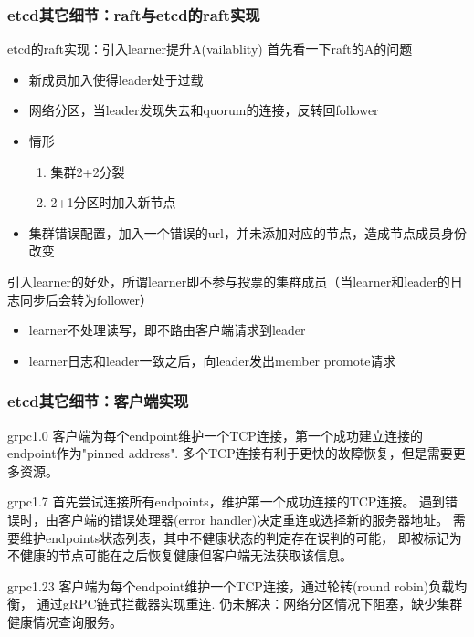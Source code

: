 \documentclass{beamer}
\begin{document}
\begin{frame}
    \frametitle{etcd其它细节：raft与etcd的raft实现}
    \begin{block}{etcd的raft实现：引入learner提升A(vailablity)}
    首先看一下raft的A的问题
    \begin{itemize}
        \item 新成员加入使得leader处于过载
        \item 网络分区，当leader发现失去和quorum的连接，反转回follower
        \item 情形
            \begin{enumerate}
                \item 集群2+2分裂
                \item 2+1分区时加入新节点
            \end{enumerate}
        \item 集群错误配置，加入一个错误的url，并未添加对应的节点，造成节点成员身份改变
    \end{itemize}
    引入learner的好处，所谓learner即不参与投票的集群成员（当learner和leader的日志同步后会转为follower）
    \begin{itemize}
        \item learner不处理读写，即不路由客户端请求到leader
        \item learner日志和leader一致之后，向leader发出member promote请求
    \end{itemize}
    \end{block}
\end{frame}



%
%
\begin{frame}
\frametitle{etcd其它细节：客户端实现}

\begin{block}{grpc1.0}
客户端为每个endpoint维护一个TCP连接，第一个成功建立连接的endpoint作为"pinned address". 
多个TCP连接有利于更快的故障恢复，但是需要更多资源。
\end{block}

\begin{block}{grpc1.7}
首先尝试连接所有endpoints，维护第一个成功连接的TCP连接。
遇到错误时，由客户端的错误处理器(error handler)决定重连或选择新的服务器地址。
需要维护endpoints状态列表，其中不健康状态的判定存在误判的可能，
即被标记为不健康的节点可能在之后恢复健康但客户端无法获取该信息。
\end{block}

\begin{block}{grpc1.23}
客户端为每个endpoint维护一个TCP连接，通过轮转(round robin)负载均衡，
通过gRPC链式拦截器实现重连.
\alert{仍未解决：}网络分区情况下阻塞，缺少集群健康情况查询服务。
\end{block}

\end{frame}
\end{document}
